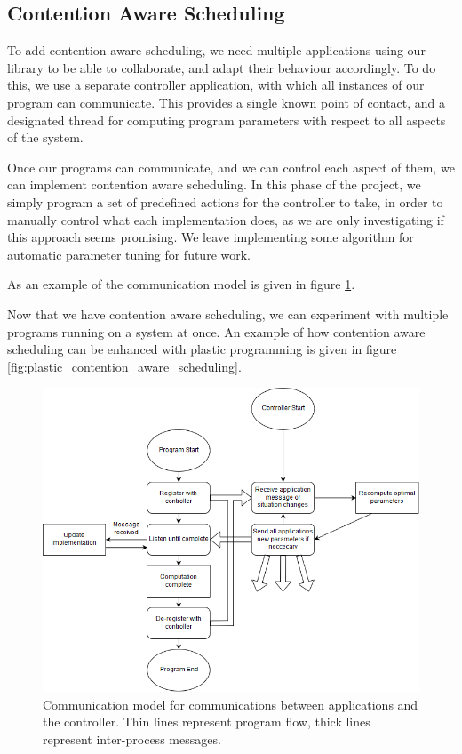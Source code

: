\subsection{Contention Aware Scheduling}
\label{subsection:design_contention_aware_scheduling}

To add contention aware scheduling, we need multiple applications using our library to be able to collaborate, and adapt their behaviour accordingly. To do this, we use a separate controller application, with which all instances of our program can communicate. This provides a single known point of contact, and a designated thread for computing program parameters with respect to all aspects of the system.

Once our programs can communicate, and we can control each aspect of them, we can implement contention aware scheduling. In this phase of the project, we simply program a set of predefined actions for the controller to take, in order to manually control what each implementation does, as we are only investigating if this approach seems promising. We leave implementing some algorithm for automatic parameter tuning for future work.

As an example of the communication model is given in figure \ref{fig:controller_flowchart}.

Now that we have contention aware scheduling, we can experiment with multiple programs running on a system at once. An example of how contention aware scheduling can be enhanced with plastic programming is given in figure \ref{fig:plastic_contention_aware_scheduling}.



\begin{figure}
	\centering
	\includegraphics[width=\textwidth]{graphics/controller_communication_flowchart.png}
	\caption{Communication model for communications between applications and the controller. Thin lines represent program flow, thick lines represent inter-process messages.}
	\label{fig:controller_flowchart}
\end{figure}

